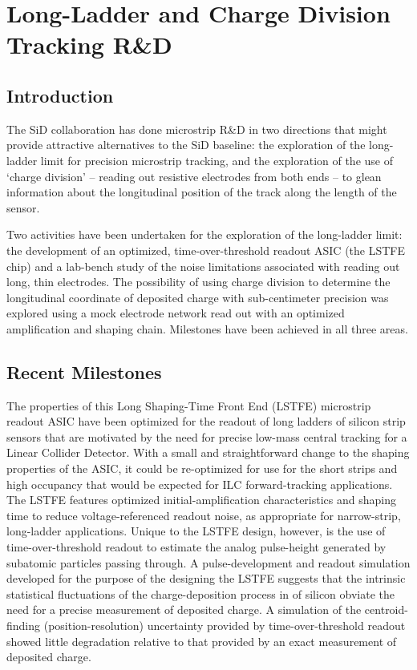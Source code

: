 
\section{Long-Ladder and Charge Division Tracking R\&D}

\subsection{Introduction}

The SiD collaboration has done microstrip R\&D in two directions that might provide attractive
alternatives to the SiD baseline: the exploration of the long-ladder limit for precision
microstrip tracking, and the exploration of the use of `charge division' -- reading out
resistive electrodes from both ends --
to glean information about the longitudinal position of the track
along the length of the sensor.

Two activities have been undertaken for the exploration of the long-ladder limit:
the development of an optimized, time-over-threshold readout ASIC (the LSTFE chip)
and a lab-bench study of the noise limitations associated with reading out long,
thin electrodes.
The possibility of using charge division to determine the longitudinal
coordinate of deposited charge with sub-centimeter precision was explored
using a mock electrode network read out with an optimized amplification and
shaping chain. Milestones have been achieved in all three areas.

\subsection{Recent Milestones}

The properties of this Long Shaping-Time Front End (LSTFE) microstrip readout ASIC have
been optimized for the readout of long ladders of silicon strip sensors that are motivated
by the need for precise low-mass central tracking for a Linear Collider Detector. With a
small and straightforward change to the shaping properties of the ASIC, it could be re-optimized
for use for the short strips and high occupancy that would be expected for ILC forward-tracking applications.
The LSTFE features optimized initial-amplification characteristics
and shaping time to reduce voltage-referenced readout noise, as appropriate for narrow-strip, long-ladder
applications. Unique to the LSTFE design, however, is the use of time-over-threshold readout to estimate the
analog pulse-height generated by subatomic particles passing through. A pulse-development and readout simulation developed
for the purpose of the designing the LSTFE suggests that the intrinsic statistical fluctuations of the
charge-deposition process in \unit[300]{\micron} of silicon obviate the need for a precise measurement
of deposited charge. A simulation of the centroid-finding (position-resolution) uncertainty provided by
time-over-threshold readout showed little degradation relative to that provided by an exact measurement of
deposited charge.


